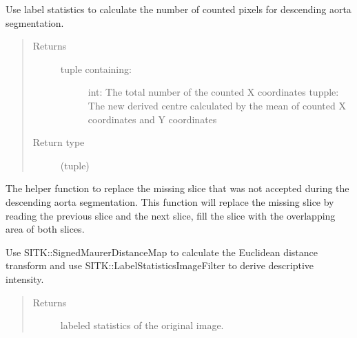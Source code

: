 \documentclass[letterpaper,10pt,english]{sphinxmanual}
\begin{document}
\begin{fulllineitems}
\begin{fulllineitems}
\label{\detokenize{AortaGeomReconDisplayModuleLib:AortaSegmenter.AortaSegmenter.__count_pixel_des}}
\sphinxAtStartPar
Use label statistics to calculate the number of counted pixels for descending aorta segmentation.
\begin{quote}\begin{description}
\item[{Returns}] \leavevmode
\sphinxAtStartPar
\begin{description}
\item[{tuple containing:}] \leavevmode
\sphinxAtStartPar
int: The total number of the counted X coordinates
tupple: The new derived centre calculated by the mean of counted X coordinates and Y coordinates

\end{description}


\item[{Return type}] \leavevmode
\sphinxAtStartPar
(tuple)

\end{description}\end{quote}

\end{fulllineitems}


\begin{fulllineitems}
\label{\detokenize{AortaGeomReconDisplayModuleLib:AortaSegmenter.AortaSegmenter.__filling_missing_slices}}
\sphinxAtStartPar
The helper function to replace the missing slice that was not accepted during the descending aorta segmentation.
This function will replace the missing slice by reading the previous slice and the next slice,
fill the slice with the overlapping area of both slices.

\end{fulllineitems}


\begin{fulllineitems}
\label{\detokenize{AortaGeomReconDisplayModuleLib:AortaSegmenter.AortaSegmenter.__get_label_statistics}}
\sphinxAtStartPar
Use SITK::SignedMaurerDistanceMap to calculate the Euclidean distance transform
and use SITK::LabelStatisticsImageFilter to derive descriptive intensity.
\begin{quote}\begin{description}
\item[{Returns}] \leavevmode
\sphinxAtStartPar
labeled statistics of the original image.


\end{description}
\end{quote}
\end{fulllineitems}
\end{fulllineitems}
\end{document}
